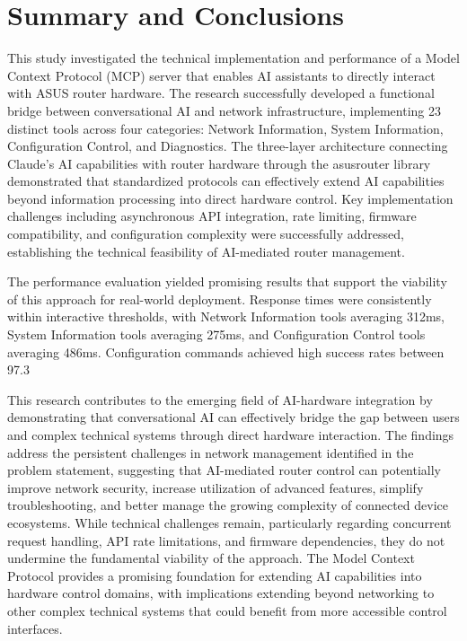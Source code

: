 \chapter{Summary and Conclusions}
\label{chap:conclusions}

This study investigated the technical implementation and performance of a Model Context Protocol (MCP) server that enables AI assistants to directly interact with ASUS router hardware. The research successfully developed a functional bridge between conversational AI and network infrastructure, implementing 23 distinct tools across four categories: Network Information, System Information, Configuration Control, and Diagnostics. The three-layer architecture connecting Claude's AI capabilities with router hardware through the asusrouter library demonstrated that standardized protocols can effectively extend AI capabilities beyond information processing into direct hardware control. Key implementation challenges including asynchronous API integration, rate limiting, firmware compatibility, and configuration complexity were successfully addressed, establishing the technical feasibility of AI-mediated router management.

The performance evaluation yielded promising results that support the viability of this approach for real-world deployment. Response times were consistently within interactive thresholds, with Network Information tools averaging 312ms, System Information tools averaging 275ms, and Configuration Control tools averaging 486ms. Configuration commands achieved high success rates between 97.3%

This research contributes to the emerging field of AI-hardware integration by demonstrating that conversational AI can effectively bridge the gap between users and complex technical systems through direct hardware interaction. The findings address the persistent challenges in network management identified in the problem statement, suggesting that AI-mediated router control can potentially improve network security, increase utilization of advanced features, simplify troubleshooting, and better manage the growing complexity of connected device ecosystems. While technical challenges remain, particularly regarding concurrent request handling, API rate limitations, and firmware dependencies, they do not undermine the fundamental viability of the approach. The Model Context Protocol provides a promising foundation for extending AI capabilities into hardware control domains, with implications extending beyond networking to other complex technical systems that could benefit from more accessible control interfaces.
